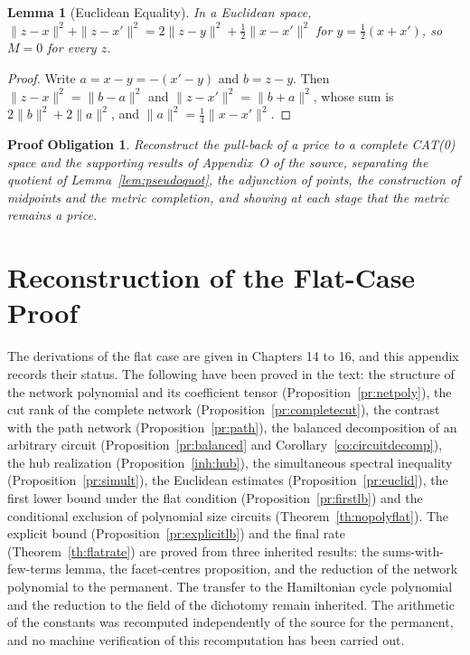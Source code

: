 \documentclass[11pt,letterpaper]{report}
\theoremstyle{plain}
\newtheorem{lemma}[theorem]{Lemma}
\newtheorem{obligation}[theorem]{Proof Obligation}
\theoremstyle{definition}
\theoremstyle{remark}
\begin{document}
\begin{lemma}[Euclidean Equality]\label{lem:euclidpar}
In a Euclidean space, $\|z-x\|^2+\|z-x'\|^2=2\|z-y\|^2+\tfrac12\|x-x'\|^2$ for $y=\tfrac12(x+x')$, so $M=0$ for every $z$.
\end{lemma}
\begin{proof}
Write $a=x-y=-(x'-y)$ and $b=z-y$. Then $\|z-x\|^2=\|b-a\|^2$ and $\|z-x'\|^2=\|b+a\|^2$, whose sum is $2\|b\|^2+2\|a\|^2$, and $\|a\|^2=\tfrac14\|x-x'\|^2$.
\end{proof}

\begin{obligation}\label{ob:caat0}
Reconstruct the pull-back of a price to a complete CAT(0) space and the supporting results of Appendix~O of the source, separating the quotient of Lemma~\ref{lem:pseudoquot}, the adjunction of points, the construction of midpoints and the metric completion, and showing at each stage that the metric remains a price.
\end{obligation}

\chapter{Reconstruction of the Flat-Case Proof}

The derivations of the flat case are given in Chapters 14 to 16, and this appendix records their status. The following have been proved in the text: the structure of the network polynomial and its coefficient tensor (Proposition~\ref{pr:netpoly}), the cut rank of the complete network (Proposition~\ref{pr:completecut}), the contrast with the path network (Proposition~\ref{pr:path}), the balanced decomposition of an arbitrary circuit (Proposition~\ref{pr:balanced} and Corollary~\ref{co:circuitdecomp}), the hub realization (Proposition~\ref{inh:hub}), the simultaneous spectral inequality (Proposition~\ref{pr:simult}), the Euclidean estimates (Proposition~\ref{pr:euclid}), the first lower bound under the flat condition (Proposition~\ref{pr:firstlb}) and the conditional exclusion of polynomial size circuits (Theorem~\ref{th:nopolyflat}). The explicit bound (Proposition~\ref{pr:explicitlb}) and the final rate (Theorem~\ref{th:flatrate}) are proved from three inherited results: the sums-with-few-terms lemma, the facet-centres proposition, and the reduction of the network polynomial to the permanent. The transfer to the Hamiltonian cycle polynomial and the reduction to the field of the dichotomy remain inherited. The arithmetic of the constants was recomputed independently of the source for the permanent, and no machine verification of this recomputation has been carried out.
\end{document}
